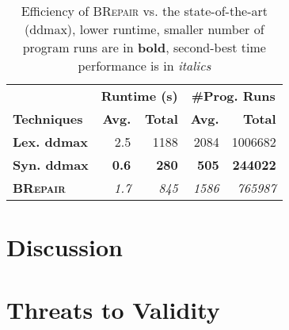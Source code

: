 \documentclass[sigconf,review,anonymous]{acmart}
\newenvironment{result}{\begin{framed}\centering\it}{\end{framed}}
\newcommand{\approach}{\textsc{BRepair}\xspace}
\begin{document}
\begin{table}[!tbp]\centering
\caption{Efficiency of \approach vs. the state-of-the-art (ddmax), lower runtime, smaller number of program runs %
are in \textbf{bold}, second-best time performance is in \textit{italics}}
\begin{tabular}{|l |  r  r | r  r |}
\hline
&  \multicolumn{2}{c|}{\textbf{Runtime (s)}} & \multicolumn{2}{c|}{\textbf{\#Prog. Runs}}  \\
\textbf{Techniques} %
&  \textbf{Avg.}  & \textbf{Total} & \textbf{Avg.}  & \textbf{Total} \\
\hline
\textbf{Lex. ddmax} & %
2.5 & 1188 & 2084 & 1006682 \\
\textbf{Syn. ddmax} & %
\textbf{0.6} & \textbf{280}  & \textbf{505}  & \textbf{244022}  \\
\hline
\textbf{\approach} &  %
\textit{1.7} & \textit{845}  & \textit{1586} & \textit{765987}  \\
\hline
\end{tabular}
\label{tab:efficiency}
\end{table}




%
%
%
%
%
%
%
%
%



\section{Discussion}

\section{Threats to Validity}
\end{document}
